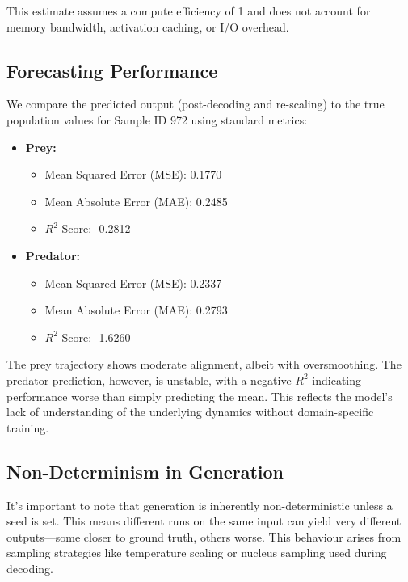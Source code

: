 \documentclass[a4paper,12pt]{article}
\begin{document}
  This estimate assumes a compute efficiency of 1 and does not account for memory bandwidth, activation caching, or I/O overhead.
  
  \subsection*{Forecasting Performance}
  
  We compare the predicted output (post-decoding and re-scaling) to the true population values for Sample ID 972 using standard metrics:
  
  \begin{itemize}
    \item \textbf{Prey:}
      \begin{itemize}
        \item Mean Squared Error (MSE): 0.1770
        \item Mean Absolute Error (MAE): 0.2485
        \item $R^2$ Score: -0.2812
      \end{itemize}
    \item \textbf{Predator:}
      \begin{itemize}
        \item Mean Squared Error (MSE): 0.2337
        \item Mean Absolute Error (MAE): 0.2793
        \item $R^2$ Score: -1.6260
      \end{itemize}
  \end{itemize}
  
  The prey trajectory shows moderate alignment, albeit with oversmoothing. The predator prediction, however, is unstable, with a negative $R^2$ indicating performance worse than simply predicting the mean. This reflects the model’s lack of understanding of the underlying dynamics without domain-specific training.
  
  \subsection*{Non-Determinism in Generation}
  
  It’s important to note that generation is inherently non-deterministic unless a seed is set. This means different runs on the same input can yield very different outputs—some closer to ground truth, others worse. This behaviour arises from sampling strategies like temperature scaling or nucleus sampling used during decoding.
  
\end{document}
